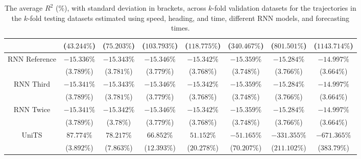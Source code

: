 \begin{table}[!ht]
{\begin{tabular}{|c|c|c|c|c|c|c|c|}
			 & ($43.244\%$) & ($75.203\%$) & ($103.793\%$) & ($118.775\%$) & ($340.467\%$) & ($801.501\%$) & ($1143.714\%$) \\ \hline
			\multirow{2}{*}{RNN Reference} & $-15.336\%$ & $-15.343\%$ & $-15.346\%$ & $-15.342\%$ & $-15.359\%$ & $-15.284\%$ & $-14.997\%$ \\
			 & ($3.789\%$) & ($3.781\%$) & ($3.779\%$) & ($3.768\%$) & ($3.748\%$) & ($3.766\%$) & ($3.664\%$) \\ \hline
			\multirow{2}{*}{RNN Third} & $-15.341\%$ & $-15.343\%$ & $-15.346\%$ & $-15.342\%$ & $-15.359\%$ & $-15.284\%$ & $-14.997\%$ \\
			 & ($3.789\%$) & ($3.781\%$) & ($3.779\%$) & ($3.768\%$) & ($3.748\%$) & ($3.766\%$) & ($3.664\%$) \\ \hline
			\multirow{2}{*}{RNN Twice} & $-15.341\%$ & $-15.342\%$ & $-15.346\%$ & $-15.342\%$ & $-15.359\%$ & $-15.284\%$ & $-14.997\%$ \\
			 & ($3.789\%$) & ($3.78\%$) & ($3.779\%$) & ($3.768\%$) & ($3.748\%$) & ($3.766\%$) & ($3.664\%$) \\ \hline
			\multirow{2}{*}{UniTS} & $87.774\%$ & $78.217\%$ & $66.852\%$ & $51.152\%$ & $-51.165\%$ & $-331.355\%$ & $-671.365\%$ \\
			 & ($3.892\%$) & ($7.863\%$) & ($12.393\%$) & ($20.278\%$) & ($70.207\%$) & ($211.102\%$) & ($383.79\%$) \\ \hline
		\end{tabular}
	}
	\caption{The average $R^{2}$ (\%), with standard deviation in brackets, across $k$-fold validation datasets for the trajectories in the $k$-fold testing datasets estimated using speed, heading, and time, different RNN models, and forecasting times.}
	\label{tab:all_speed_actual_dir_R2}
\end{table}

